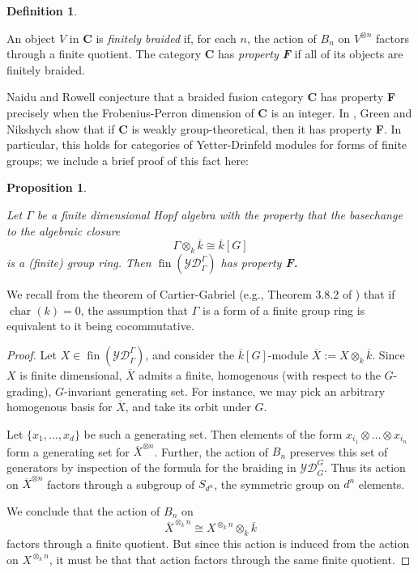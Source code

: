 \documentclass[12pt]{article}
\DeclareMathOperator{\car}{char}
\DeclareMathOperator{\fin}{fin}
\newcommand{\kbar}{\overline{k}}
\newcommand{\bC} {\mathbf{C}}
\newcommand{\YD} {\mathcal{YD}}
\newcommand{\Xbar}{\overline{X}}
\theoremstyle{plain}
\newtheorem{prop}[thm]{Proposition}
\theoremstyle{definition}
\newtheorem{defn}[thm]{Definition}
\theoremstyle{remark}
\begin{document}
\begin{defn} \label{fin_braid_defn}

An object $V$ in $\bC$ is \emph{finitely braided} if, for each $n$, the action of $B_n$ on $V^{\otimes n}$ factors through a finite quotient.  The category $\bC$ has \emph{property {\bf F}} if all of its objects are finitely braided.

\end{defn}

Naidu and Rowell conjecture that a braided fusion category $\bC$ has property {\bf F} precisely when the Frobenius-Perron dimension of $\bC$ is an integer.  In \cite{green-nikshych}, Green and Nikshych show that if $\bC$ is weakly group-theoretical, then it has property {\bf F}.  In particular, this holds for categories of Yetter-Drinfeld modules for forms of finite groups; we include a brief proof of this fact here:

\begin{prop} \label{YD_profinite_prop} 

Let $\Gamma$ be a finite dimensional Hopf algebra with the property that the basechange to the algebraic closure 
%
$$\Gamma \otimes_k \kbar \cong \kbar[G]$$
%
is a (finite) group ring.  Then $\fin(\mathcal{YD}_\Gamma^\Gamma)$ has property \bf{F}.

\end{prop}

We recall from the theorem of Cartier-Gabriel (e.g., Theorem 3.8.2 of \cite{cartier}) that if $\car(k)=0$, the assumption that $\Gamma$ is a form of a finite group ring is equivalent to it being cocommutative.

\begin{proof}

Let $X \in \fin(\YD_\Gamma^\Gamma)$, and consider the $\kbar[G]$-module $\Xbar := X \otimes_k \kbar$. Since $X$ is finite dimensional, $\Xbar$ admits a finite, homogenous (with respect to the $G$-grading), $G$-invariant generating set.  For instance, we may pick an arbitrary homogenous basis for $\Xbar$, and take its orbit under $G$.  

Let $\{x_1, \dots, x_d\}$ be such a generating set.  Then elements of the form $x_{i_1} \otimes \dots \otimes x_{i_n}$ form a generating set for $\Xbar^{\otimes n}$.  Further, the action of $B_n$ preserves this set of generators by inspection of the formula for the braiding in $\mathcal{YD}_G^G$.  Thus its action on $\Xbar^{\otimes n}$ factors through a subgroup of $S_{d^n}$, the symmetric group on $d^n$ elements.

We conclude that the action of $B_n$ on 
%
$$\Xbar^{\otimes_{\kbar} n} \cong X^{\otimes_k n} \otimes_k \kbar$$
%
factors through a finite quotient.  But since this action is induced from the action on $X^{\otimes_k n}$, it must be that that action factors through the same finite quotient.

\end{proof}
\end{document}
